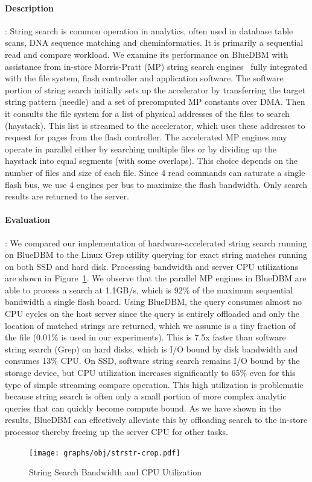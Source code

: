 \paragraph{Description} :
String search is common operation in analytics, often used in
database table scans, DNA sequence matching and cheminformatics. It is 
primarily a sequential read and compare workload. We
examine its performance on BlueDBM with assistance from in-store Morris-Pratt (MP) 
string search engines~\cite{mpalgo} fully integrated with the file system, flash controller
and application software.  The software portion of string search initially sets
up the accelerator by transferring the target string pattern (needle) and a set
of precomputed MP constants over DMA. Then it consults the file system for a
list of physical addresses of the files to search (haystack).  This list is
streamed to the accelerator, which uses these addresses to request for pages
from the flash controller.  The accelerated MP engines may operate in parallel
either by searching multiple files or by dividing up the haystack into equal
segments (with some overlaps). This choice depends on the number of files and
size of each file. Since 4 read commands can saturate a single flash bus, we
use 4 engines per bus to maximize the flash bandwidth. Only
search results are returned to the server. 

\paragraph{Evaluation} :
We compared our implementation of hardware-accelerated string search running on
BlueDBM to the Linux Grep utility querying for exact string matches running
on both SSD and hard disk. Processing bandwidth and server CPU utilizations are
shown in Figure~\ref{fig:result_strstr}. We observe that the parallel MP
engines in BlueDBM are able to process a search at 1.1GB/s, which is 92\% of
the maximum sequential bandwidth a single flash board. Using BlueDBM, the
query consumes almost no CPU cycles on the host server since the query is
entirely offloaded and only the location of matched strings are returned, which
we assume is a tiny fraction of the file (0.01\% is used in our experiments).
This is 7.5x faster than software string search (Grep) on hard disks, which is
I/O bound by disk bandwidth and consumes 13\% CPU. On SSD, software string
search remains I/O bound by the storage device, but CPU utilization increases
significantly to 65\% even for this type of simple streaming compare operation.
This high utilization is problematic because string search is often only a small portion 
of more complex analytic queries that can quickly become compute bound.  As we
have shown in the results, BlueDBM can effectively alleviate this by
offloading search to the in-store processor thereby freeing up the server CPU
for other tasks. 
 


\begin{figure}[t]
	\centering
	\texttt{[image: graphs/obj/strstr-crop.pdf]}
	\caption{String Search Bandwidth and CPU Utilization}
	\label{fig:result_strstr}
\end{figure}

